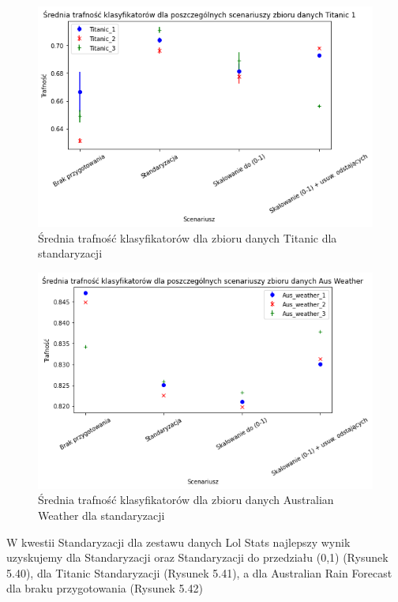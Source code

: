 \documentclass{book}
\begin{document}
\begin{figure}[H]
    \centerline{\includegraphics[scale=0.8]{Titanic_Avg_Standaryzacja}}
    \centering
    \caption{Średnia trafność klasyfikatorów dla zbioru danych Titanic 
    dla standaryzacji}
    \end{figure}

\begin{figure}[H]
    \centerline{\includegraphics[scale=0.8]{Aus_Weather_Avg_Standaryzacja}}
    \centering
    \caption{Średnia trafność klasyfikatorów dla zbioru danych Australian Weather 
    dla standaryzacji}
    \end{figure}

    W kwestii Standaryzacji dla zestawu danych Lol Stats 
    najlepszy wynik uzyskujemy dla Standaryzacji oraz 
    Standaryzacji do przedziału (0,1) (Rysunek 5.40), dla 
    Titanic Standaryzacji (Rysunek 5.41), a dla Australian 
    Rain Forecast dla braku przygotowania (Rysunek 5.42)
\end{document}
